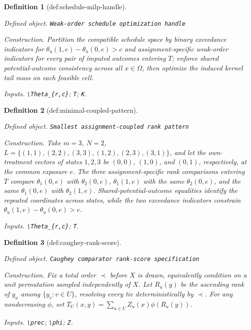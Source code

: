 \documentclass{article}
\newtheorem{definition}{Definition}
\begin{document}
\begin{definition}[def:schedule-milp-handle]\label{def:schedule-milp-handle}
\par\smallskip\noindent\emph{Defined object.} \texttt{Weak-\allowbreak{}order schedule optimization handle}
\par\smallskip\noindent\emph{Construction.} Partition the compatible schedule space by binary exceedance indicators for \(\theta_u(1,e)-\theta_u(0,e)>c\) and assignment-specific weak-order indicators for every pair of imputed outcomes entering \(T\); enforce shared potential-outcome consistency across all \(x\in\Omega\), then optimize the induced kernel tail mass on each feasible cell.
\par\smallskip\noindent\emph{Inputs.} \texttt{\textbackslash{}\allowbreak{}Theta\_\allowbreak{}\{r,\allowbreak{}c\}\allowbreak{}}; \texttt{T}; \texttt{K}.
\end{definition}

\begin{definition}[def:minimal-coupled-pattern]\label{def:minimal-coupled-pattern}
\par\smallskip\noindent\emph{Defined object.} \texttt{Smallest assignment-\allowbreak{}coupled rank pattern}
\par\smallskip\noindent\emph{Construction.} Take \(m=3\), \(N=2\), \(L=\{(1,1),(2,2),(3,3),(1,2),(2,3),(3,1)\}\), and let the own-treatment vectors of states \(1,2,3\) be \((0,0)\), \((1,0)\), and \((0,1)\), respectively, at the common exposure \(e\). The three assignment-specific rank comparisons entering \(T\) compare \(\theta_1(0,e)\) with \(\theta_2(0,e)\), \(\theta_1(1,e)\) with the same \(\theta_2(0,e)\), and the same \(\theta_1(0,e)\) with \(\theta_2(1,e)\). Shared-potential-outcome equalities identify the repeated coordinates across states, while the two exceedance indicators constrain \(\theta_u(1,e)-\theta_u(0,e)>c\).
\par\smallskip\noindent\emph{Inputs.} \texttt{\textbackslash{}\allowbreak{}Theta\_\allowbreak{}\{r,\allowbreak{}c\}\allowbreak{}}; \texttt{T}.
\end{definition}

\begin{definition}[def:caughey-rank-score]\label{def:caughey-rank-score}
\par\smallskip\noindent\emph{Defined object.} \texttt{Caughey comparator rank-\allowbreak{}score specification}
\par\smallskip\noindent\emph{Construction.} Fix a total order \(\prec\) before \(X\) is drawn, equivalently condition on a unit permutation sampled independently of \(X\). Let \(R_u(y)\) be the ascending rank of \(y_u\) among \(\{y_v:v\in U\}\), resolving every tie deterministically by \(\prec\). For any nondecreasing \(\phi\), set \(T_{\mathrm C}(x,y)=\sum_{u\in U}Z_u(x)\phi(R_u(y))\).
\par\smallskip\noindent\emph{Inputs.} \texttt{\textbackslash{}\allowbreak{}prec}; \texttt{\textbackslash{}\allowbreak{}phi}; \texttt{Z}.
\end{definition}
\end{document}
